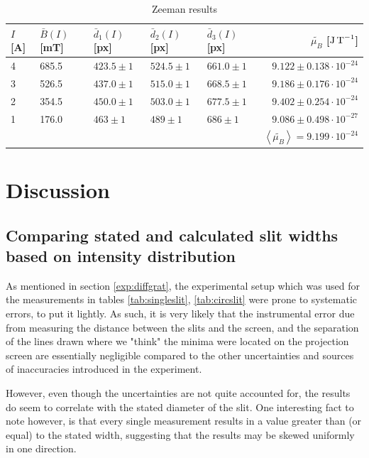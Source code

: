 \documentclass[11pt,a4paper]{article}
\begin{document}
      \begin{table}[H]
        \center
        \caption{Zeeman results}
        \begin{tabular}{ l  l  l  l  l  r }
          $I$ [A] & $\bar B(I)$ [mT] & $\bar d_1(I)$ [px] & $\bar d_2(I)$ [px] & $\bar d_3(I)$ [px] & $\tilde{\mu_B}$ [$\textup J\,\textup T^{-1}$] \\ \hline

          4 & 685.5 & $423.5 \pm 1$ & $524.5 \pm 1$ & $661.0 \pm 1$ & $9.122\pm 0.138 \cdot 10^{-24}$ \\
          3 & 526.5 & $437.0 \pm 1$ & $515.0 \pm 1$ & $668.5 \pm 1$ & $9.186\pm 0.176\cdot 10^{-24}$ \\ 
          2 & 354.5 & $450.0 \pm 1$ & $503.0 \pm 1$ & $677.5 \pm 1$ & $9.402\pm 0.254\cdot 10^{-24}$ \\ 
          1 & 176.0 & $463 \pm 1$ & $489 \pm 1$ & $686 \pm 1$ & $9.086\pm 0.498\cdot 10^{-27}$ \\  \hline
            &       &   &     &     &     $\left< \tilde{\mu_B}\right>= 9.199\cdot 10^{-24}$
        \end{tabular}
        \label{tab:zeeman_table}
    \end{table}



\section{\label{sect:discuss}Discussion}
  \subsection{Comparing stated and calculated slit widths based on intensity distribution}
    As mentioned in section \ref{exp:diffgrat}, the experimental setup which was used for the measurements in tables \ref{tab:singleslit}, \ref{tab:circslit} were prone to systematic errors, to put it lightly. As such, it is very likely that the instrumental error due from measuring the distance between the slits and the screen, and the separation of the lines drawn where we "think" the minima were located on the projection screen are essentially negligible compared to the other uncertainties and sources of inaccuracies introduced in the experiment. 

    However, even though the uncertainties are not quite accounted for, the results do seem to correlate with the stated diameter of the slit. One interesting fact to note however, is that every single measurement results in a value greater than (or equal) to the stated width, suggesting that the results may be skewed uniformly in one direction.
\end{document}
